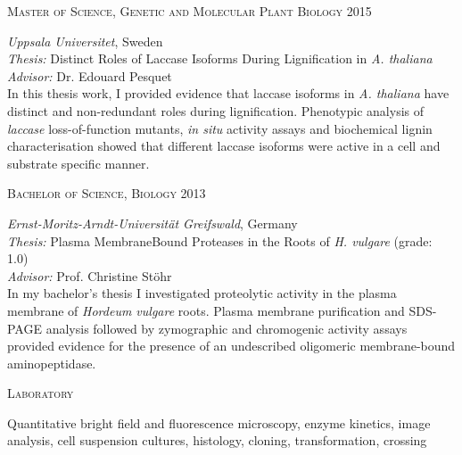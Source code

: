 \documentclass[11pt]{article}
\begin{document}
\textsc{\large{Master of Science, Genetic and Molecular Plant Biology} \hfill \textsc{2015}}
\begin{addmargin}[24pt]{0pt}
	\textit{Uppsala Universitet}, Sweden \\
	\textit{Thesis:} Distinct Roles of Laccase Isoforms During Lignification in \textit{ A. thaliana}\\
	\textit{Advisor:} Dr. Edouard Pesquet
	\vspace{0.1cm} \\
	\small{In this thesis work, I provided evidence that laccase isoforms in \textit{A. thaliana} have distinct and non-redundant roles during lignification. Phenotypic analysis of \textit{laccase} loss-of-function mutants, \textit{in situ} activity assays and biochemical lignin characterisation showed that different laccase isoforms were active in a cell and substrate specific manner.}
\end{addmargin}
\vspace{0.2cm}

\textsc{\large{Bachelor of Science, Biology} \hfill \textsc{2013}}
\begin{addmargin}[24pt]{0pt}
	\textit{Ernst-Moritz-Arndt-Universität Greifswald}, Germany \\
	\textit{Thesis:} Plasma Membrane\textendash Bound Proteases in the Roots of \textit{H. vulgare} (grade: \textsc{1.0}) \\
	\textit{Advisor:} Prof. Christine Stöhr
	\vspace{0.1cm} \\
	\small{In my bachelor's thesis I investigated proteolytic activity in the plasma membrane of \textit{Hordeum vulgare} roots. Plasma membrane purification and SDS-PAGE analysis followed by zymographic and chromogenic activity assays provided evidence for the presence of an undescribed oligomeric membrane-bound aminopeptidase.}
\end{addmargin}
\vspace{0.5cm}


\textsc{\large{Laboratory}} 
\begin{addmargin}[24pt]{0pt}
	Quantitative bright field and fluorescence microscopy, enzyme kinetics, image analysis, cell suspension cultures, histology, cloning, transformation, crossing
\end{addmargin}
\vspace{0.2cm}
\end{document}
